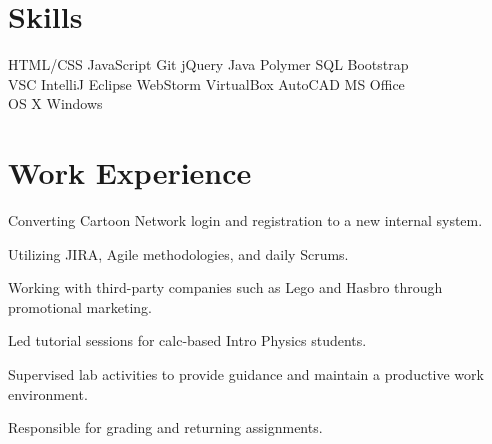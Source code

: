 \documentclass[]{deedy-resume-openfont}
\begin{document}
\begin{minipage}[t]{0.66\textwidth}


\section{Skills}
HTML/CSS \textbullet{} JavaScript \textbullet{} Git \textbullet{} jQuery \textbullet{} Java \textbullet{} Polymer \textbullet{} SQL \textbullet{} Bootstrap\\
VSC \textbullet{} IntelliJ \textbullet{} Eclipse \textbullet{} WebStorm \textbullet{} VirtualBox \textbullet{} AutoCAD \textbullet{} MS Office \\
OS X \textbullet{} Windows \\
\sectionsep


\section{Work Experience}

\vspace{\topsep} %
\begin{tightemize}
\item Converting Cartoon Network login and registration to a new internal system.
\item Utilizing JIRA, Agile methodologies, and daily Scrums.
\item Working with third-party companies such as Lego and Hasbro through promotional marketing.
\end{tightemize}
\sectionsep

\begin{tightemize}
\item Led tutorial sessions for calc-based Intro Physics students.
\item Supervised lab activities to provide guidance and maintain a productive work environment.
\item Responsible for grading and returning assignments.
\end{tightemize}
\sectionsep


\end{minipage}
\end{document}
